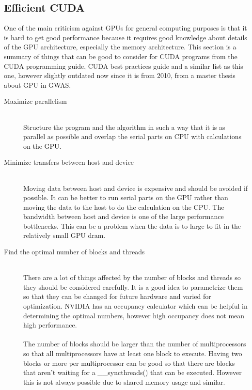 \documentclass[10pt,a4paper]{report}
\begin{document}
\subsection{Efficient CUDA}
One of the main criticism against GPUs for general computing purposes is that it is hard to get good performance because it requires good knowledge about details of the GPU architecture, especially the memory architecture. This section is a summary of things that can be good to consider for CUDA programs from the CUDA programming guide\cite{cuda}, CUDA best practices guide \cite{cuda_best_practice} and a similar list as this one, however slightly outdated now since it is from 2010, from a master thesis about GPU in GWAS\cite{plink_gpu}.
\\
\begin{description}
  \item[Maximize parallelism] \hfill \\
  Structure the program and the algorithm in such a way that it is as parallel as possible and overlap the serial parts on CPU with calculations on the GPU.\cite{plink_gpu, cuda}
  \item[Minimize transfers between host and device] \hfill \\
  Moving data between host and device is expensive and should be avoided if possible. It can be better to run serial parts on the GPU rather than moving the data to the host to do the calculation on the CPU. The bandwidth between host and device is one of the large performance bottlenecks. This can be a problem when the data is to large to fit in the relatively small GPU dram.\cite{cuda, cuda_best_practice}
  \item[Find the optimal number of blocks and threads] \hfill \\
  There are a lot of things affected by the number of blocks and threads so they should be considered carefully. It is a good idea to parametrize them so that they can be changed for future hardware and varied for optimization. NVIDIA has an occupancy calculator which can be helpful in determining the optimal numbers, however high occupancy does not mean high performance.\cite{cuda, cuda_best_practice}\\
  \\
  The number of blocks should be larger than the number of multiprocessors so that all multiprocessors have at least one block to execute. Having two blocks or more per multiprocessor can be good so that there are blocks that aren't waiting for a \_\_syncthreads() that can be executed. However this is not always possible due to shared memory usage and similar.\cite{cuda_best_practice}\\

\end{description}
\end{document}
